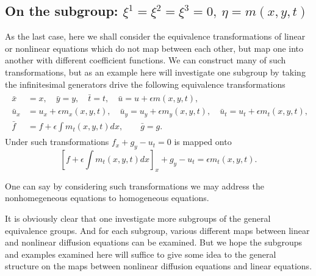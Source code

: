 \documentclass[a4paper]{article}
\def\bes{\begin{equation*}}
\def\ees{\end{equation*}}
\def\beas{\begin{eqnarray*}}
\def\eeas{\end{eqnarray*}}
\begin{document}
\subsection{On the subgroup: $\xi^1=\xi^2=\xi^3=0, \ \eta=m(x,y,t)$ }
As the last case, here we shall consider  the equivalence
transformations of linear or nonlinear equations which do not map between each other, but map one into another  with different
coefficient functions. We can construct many of such transformations, but as an example  here will investigate one subgroup by taking the infinitesimal generators  drive the following
 equivalence transformations
 \beas
 \begin{split}
 \bar x&=x,\quad \bar y=y,\quad \bar t=t,\quad \bar u=u+\epsilon m(x,y,t),\\
 \bar u_x&=u_x+\epsilon m_x(x,y,t), \quad \bar u_y=u_y+\epsilon m_{y}(x,y,t),\quad  \bar u_t=u_t+\epsilon m_{t}(x,y,t),\\
 \bar f&= f+\epsilon \int m_{t}(x,y,t)dx  ,\qquad  \bar g=g.
 \end{split}
 \eeas
 Under such transformations $f_x+g_y-u_t=0$ is mapped onto
\bes
 \left[f+\epsilon \int m_{t}(x,y,t)dx\right]_x+g_y-
u_t=\epsilon m_t(x,y,t). \ees
\par
One can say by considering such transformations we may address the nonhomegeneous equations to homogeneous equations. \par
It is obviously clear that one  investigate more subgroups of the general equivalence groups. And for each subgroup, various different maps between linear and nonlinear diffusion equations can be examined. But we hope the subgroups and examples examined here will suffice to give some idea to the general structure on the maps between nonlinear diffusion equations and  linear equations.   
\end{document}
